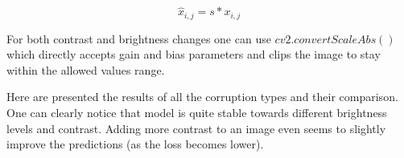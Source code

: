 \begin{equation}
    \hat{x}_{i, j} = s * x_{i, j}
\end{equation}

For both contrast and brightness changes one can use $cv2.convertScaleAbs()$ which directly accepts gain and bias parameters and clips the image to stay within the allowed values range.

Here are presented the results of all the corruption types and their comparison. One can clearly notice that model is quite stable towards different brightness levels and contrast. Adding more contrast to an image even seems to slightly improve the predictions (as the loss becomes lower). 